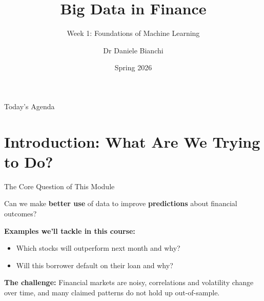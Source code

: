 \documentclass[10pt]{beamer}
\title{Big Data in Finance}
\subtitle{Week 1: Foundations of Machine Learning}
\author{Dr Daniele Bianchi}
\date{Spring 2026}
\newcommand{\highlight}[1]{\textcolor{AccentOrange}{\textbf{#1}}}
\begin{document}
\AtBeginSection[]{
  \begin{frame}[plain]
    \vfill
    \begin{center}
      {\Large\color{ThemeBlue}\insertsection}
    \end{center}
    \vfill
  \end{frame}
}


\begin{frame}[plain]
  \titlepage
\end{frame}



\begin{frame}{Today's Agenda}
  \tableofcontents
\end{frame}

\section{Introduction: What Are We Trying to Do?}

\begin{frame}{The Core Question of This Module}
  \begin{center}
    \Large
    Can we make \highlight{better use} of data to improve \highlight{predictions} about financial outcomes?
  \end{center}
  
  \vspace{2em}
  \textbf{Examples we'll tackle in this course:}
  \begin{itemize}
    \item Which stocks will outperform next month and why?
    \item Will this borrower default on their loan and why?
  \end{itemize}
  
  \vspace{1em}
  \textbf{The challenge:} Financial markets are noisy, correlations and volatility change over time, and many claimed patterns do not hold up out-of-sample.
\end{frame}
\end{document}
